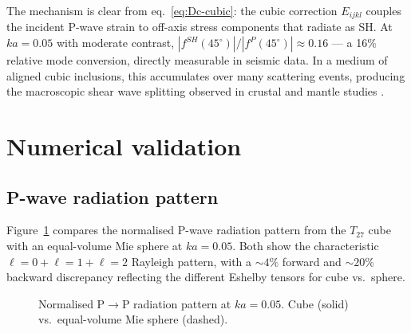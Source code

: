 \documentclass[11pt,a4paper]{article}
\theoremstyle{plain}
\theoremstyle{definition}
\theoremstyle{remark}
\begin{document}
The mechanism is clear from eq.~\eqref{eq:Dc-cubic}: the cubic
correction $E_{ijkl}$ couples the incident P-wave strain to off-axis
stress components that radiate as SH.  At $ka = 0.05$ with moderate
contrast, $|f^{SH}(45^\circ)| / |f^P(45^\circ)| \approx 0.16$
--- a 16\% relative mode conversion, directly measurable in seismic
data.  In a medium of aligned cubic inclusions, this accumulates
over many scattering events, producing the macroscopic shear wave
splitting observed in crustal and mantle studies
\cite{crampin1981,savage1999}.


\section{Numerical validation}
\label{sec:validation}

\subsection{P-wave radiation pattern}

Figure~\ref{fig:radiation-pattern} compares the normalised P-wave
radiation pattern from the $T_{27}$ cube with an equal-volume Mie
sphere at $ka = 0.05$.  Both show the characteristic
$\ell = 0 + \ell = 1 + \ell = 2$ Rayleigh pattern, with a
$\sim 4\%$ forward and $\sim 20\%$ backward discrepancy reflecting
the different Eshelby tensors for cube vs.\ sphere.

\begin{figure}[ht]
\centering
{}
\caption{Normalised P$\to$P radiation pattern at $ka = 0.05$.
Cube (solid) vs.\ equal-volume Mie sphere (dashed).}
\label{fig:radiation-pattern}
\end{figure}
\end{document}
